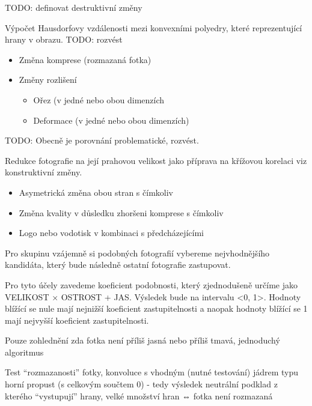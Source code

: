 TODO: definovat destruktivní změny

Výpočet Hausdorfovy vzdálenosti mezi konvexními polyedry, které reprezentující hrany v obrazu.
TODO: rozvést

\begin{itemize}
	\setlength{\parskip}{0pt}
	\setlength{\itemsep}{0pt}
	\item{Změna komprese (rozmazaná fotka)}
	\item{Změny rozlišení}
	\begin{itemize}
		\item{Ořez (v jedné nebo obou dimenzích}
		\item{Deformace (v jedné nebo obou dimenzích)}
	\end{itemize}
\end{itemize}

TODO: Obecně je porovnání problematické, rozvést.

Redukce fotografie na její prahovou velikost jako příprava na křížovou korelaci viz konstruktivní změny.

\begin{itemize}
	\setlength{\parskip}{0pt}
	\setlength{\itemsep}{0pt}
	\item {Asymetrická změna obou stran s čímkoliv}
	\item {Změna kvality v důsledku zhoršeni komprese s čímkoliv}
	\item {Logo nebo vodotisk v kombinaci s předcházejícími}
\end{itemize}

Pro skupinu vzájemně si podobných fotografií vybereme nejvhodnějšího kandidáta, který bude následně ostatní fotografie zastupovat.

Pro tyto účely zavedeme koeficient podobnosti, který zjednodušeně určíme jako VELIKOST × OSTROST + JAS. Výsledek bude na intervalu <0, 1>. Hodnoty blížící se nule mají nejnižší koeficient zastupitelnosti a naopak hodnoty blížící se 1 mají nejvyšší koeficient zastupitelnosti. 


Pouze zohlednění zda fotka není příliš jasná nebo příliš tmavá, jednoduchý algoritmus

Test “rozmazanosti” fotky, konvoluce s vhodným (nutné testování) jádrem typu horní propust (s celkovým součtem 0) - tedy výsledek neutrální podklad z kterého “vystupují” hrany, velké množství hran ⇔ fotka není rozmazaná

